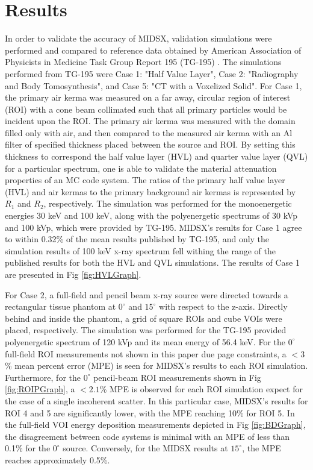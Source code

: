 \newpage
\section{Results}
\par In order to validate the accuracy of MIDSX, validation simulations were performed and compared to reference data obtained by American Association of Physicists in Medicine Task Group Report 195 (TG-195) \cite{sechopoulos_monte_2015}. The simulations performed from TG-195 were Case 1: "Half Value Layer", Case 2: "Radiography and Body Tomosynthesis", and Case 5: "CT with a Voxelized Solid". For Case 1, the primary air kerma was measured on a far away, circular region of interest (ROI) with a cone beam collimated such that all primary particles would be incident upon the ROI. The primary air kerma was measured with the domain filled only with air, and then compared to the measured air kerma with an Al filter of specified thickness placed between the source and ROI. By setting this thickness to correspond the half value layer (HVL) and quarter value layer (QVL) for a particular spectrum, one is able to validate the material attenuation properties of an MC code system. The ratios of the primary half value layer (HVL) and air kermas to the primary background air kermas is represented by $R_1$ and $R_2$, respectively. The simulation was performed for the monoenergetic energies 30 keV and 100 keV, along with the polyenergetic spectrums of 30 kVp and 100 kVp, which were provided by TG-195. MIDSX's results for Case 1 agree to within 0.32\% of the mean results published by TG-195, and only the simulation results of 100 keV x-ray spectrum fell withing the range of the published results for both the HVL and QVL simulations. The results of Case 1 are presented in Fig \ref{fig:HVLGraph}.
\par For Case 2, a full-field and pencil beam x-ray source were directed towards a rectangular tissue phantom at $0^\circ$ and $15^\circ$ with respect to the z-axis. Directly behind and inside the phantom, a grid of square ROIs and cube VOIs were placed, respectively. The simulation was performed for the TG-195 provided polyenergetic spectrum of 120 kVp and its mean energy of 56.4 keV. For the $0^\circ$ full-field ROI measurements not shown in this paper due page constraints, a $<3$\% mean percent error (MPE) is seen for MIDSX's results to each ROI simulation. Furthermore, for the $0^\circ$ pencil-beam ROI measurements shown in Fig \ref{fig:ROIPGraph}, a $<2.1$\% MPE is observed for each ROI simulation expect for the case of a single incoherent scatter. In this particular case, MIDSX's results for ROI 4 and 5 are significantly lower, with the MPE reaching 10\% for ROI 5. In the full-field VOI energy deposition measurements depicted in Fig \ref{fig:BDGraph}, the disagreement between code systems is minimal with an MPE of less than 0.1\% for the $0^\circ$ source. Conversely, for the MIDSX results at $15^\circ$, the MPE reaches approximately 0.5\%.
